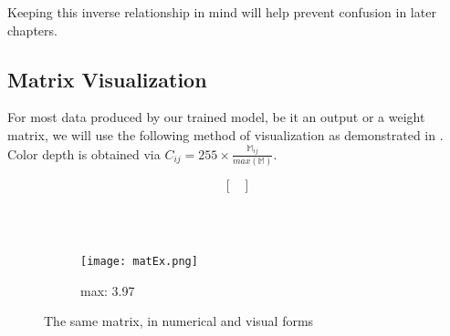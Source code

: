 Keeping this inverse relationship in mind will help prevent confusion in later 
chapters.

\subsection{Matrix Visualization}
For most data produced by our trained model, be it an output or a weight matrix, 
we will use the following method of visualization as demonstrated in 
. Color depth is  obtained via $C_{ij} = 255 \times 
\frac{\mathbb{M}_{ij}}{max(\mathbb{M})}$.
\begin{figure}[h]
	\centering
	\begin{subfigure}{\textwidth}
		\centering
		\begin{equation*}
			\begin{bmatrix}
				
			\end{bmatrix}
		\end{equation*}
	\end{subfigure}\\
	\vspace{1em}
	\\
	\vspace{1em}
	\begin{subfigure}{\textwidth}
		\centering
		\texttt{[image: matEx.png]}
		\caption{max: 3.97}
	\end{subfigure}
	\caption{The same matrix, in numerical and visual forms}
	\label{fig:matvisex}
\end{figure}\noindent


